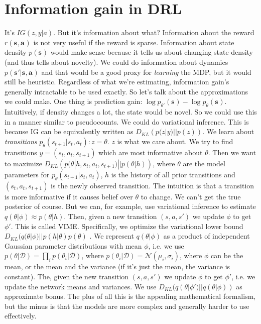 \documentclass{report}
\begin{document}
\section{Information gain in DRL}
It's $ IG(z,y|a)  $. But it's information about what?
Information about the reward $ r(\bm{s}_{}, \bm{a}_{})  $ is not very useful if the reward is sparse.
Information about state density $ p(\bm{s}_{})  $ would make sense because it tells us about changing state density (and thus tells about novelty).
We could do information about dynamics $ p(\bm{s}_{}'|\bm{s}_{}, \bm{a}_{})  $ and that would be a good proxy for \textit{learning} the MDP, but 
it would still be heuristic.
Regardless of what we're estimating, information gain's generally intractable to be used exactly.
So let's talk about the approximations we could make.
One thing is prediction gain: $ \log p_{\theta'}(\bm{s}_{}) - \log p_\theta(\bm{s}_{})  $.
Intuitively, if density changes a lot, the state would be novel. So we could use this in
a manner similar to pseudocounts.
We could do variational inference. This is because IG can be equivalently written as $ D_{KL} \left( p(z|y)||p(z) \right)   $.
We learn about \textit{transitions} $ p_\theta (s_{t+1}|s_t, a_t): z = \theta  $. $z$ is what we care about.
We try to find transitions $ y = \left( s_t, a_t, s_{t+1} \right)   $ which are most informative about $\theta$.
Then we want to maximize $ D_{KL} \left( p(\theta|h, s_t, a_t, s_{t+1})||p(\theta|h) \right)   $,
where $\theta$ are the model parameters for $ p_\theta (s_{t+1}|s_t, a_t)  $,
$h$ is the history of all prior transitions and $ \left( s_t, a_t, s_{t+1} \right)   $ is the newly
observed transition.
The intuition is that a transition is more informative if it causes belief over $\theta$ to change.
We can't get the true posterior of course.
But we can, for example, use variational inference to estimate $ q(\theta|\phi) \approx p(\theta|h)  $.
Then, given a new transition $ \left( s,a,s' \right)   $ we update $\phi$ to get $ \phi'  $.
This is called VIME. Specifically, we optimize the variational lower bound
$ D_{KL}(q(\theta|\phi)||p(h|\theta)p(\theta)  $ .
We represent $ q(\theta|\phi)  $ as a product of independent Gaussian parameter distributions with mean $ \phi  $,
i.e. we use $ p(\theta|\mathcal{D}) = \prod_{i}^{}p(\theta_i|\mathcal{D})   $,
where $ p(\theta_i|\mathcal{D}) = \mathcal{N}(\mu_i, \sigma_i)  $, where $\phi$ can be the mean, or 
the mean and the variance (if it's just the mean, the variance is constant).
The, given the new transition $ \left( s,a,s' \right)   $ we update $ \phi  $ to get $ \phi'  $,
i.e. we update the network means and variances.
We use $ D_{KL}(q(\theta|\phi')||q(\theta|\phi))  $ as approximate bonus.
The plus of all this is the appealing mathematical formalism, but the minus is that
the models are more complex and generally harder to use effectively.
\end{document}
